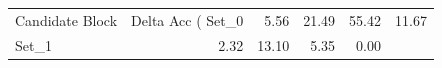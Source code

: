 \begin{tabular}{lrrrr}
\toprule
Candidate Block & Delta Acc (%
\midrule
Set_0 & 5.56 & 21.49 & 55.42 & 11.67 \\
Set_1 & 2.32 & 13.10 & 5.35 & 0.00 \\
\bottomrule
\end{tabular}
